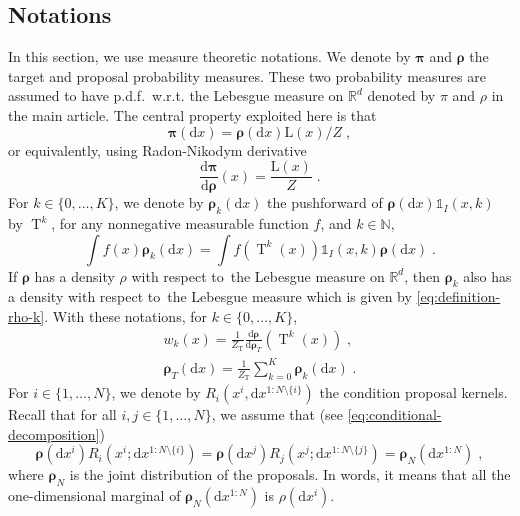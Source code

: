 \documentclass{article}
\def\transfo{\operatorname{T}}
\def\rmd{\operatorname{d}\hspace{-2pt}}
\def\rset{\mathbb{R}}
\def\nset{\mathbb{N}}
\def\dummy{f}
\def\rmd{\mathrm{d}}
\def\eqsp{\,}
\def\wrt{w.r.t.}
\def\eqsp{\;}
\newcommand{\1}{\mathds{1}}
\newcommand{\indi}[1]{\1_{#1}}
\def\w{w}
\def\target{\pi}
\def\proposal{\rho}
\newcommand{\chunku}[3]{#1^{#2:#3}}
\newcommand{\chunkum}[4]{#1^{#2:#3 \setminus \{#4\}}}
\def\rmi{\mathrm{I}}
\def\const{Z}
\def\measpi{\boldsymbol{\pi}}
\def\measprop{\boldsymbol{\rho}}
\def\rset{\mathbb{R}}
\def\nset{\mathbb{N}}
\def\rmd{\mathrm{d}}
\def\likelihood{\mathrm{L}}
\def\constT{\const_{\transfo}}
\def\pdf{p.d.f.}
\def\wrt{with respect to}
\begin{document}
 \subsection{Notations}
In this section, we use measure theoretic notations. We denote by $\measpi$ and $\measprop$ the target and proposal probability measures. These two probability measures are assumed to have \pdf\  w.r.t. the Lebesgue measure on $\rset^d$ denoted by $\target$ and $\proposal$ in the main article. %
The central property exploited here is that
\begin{equation}
\label{eq:key-relation}
\measpi(\rmd x)= \measprop(\rmd x) \likelihood(x) / \const \eqsp,
\end{equation}
or equivalently, using Radon-Nikodym derivative
\begin{equation}
\label{eq:with-derivative}
\frac{\rmd \measpi}{\rmd \measprop}(x)= \frac{\likelihood(x)}{\const}  \eqsp.
\end{equation}
For $k \in \{0,\dots,K\}$, we denote by $\measprop_k(\rmd x)$ the pushforward of $\measprop(\rmd x) \indi{I}(x,k)$ by $\transfo^k$, for any nonnegative measurable function $f$, and $k \in \nset$,
\begin{equation}
\int f(x) \measprop_k( \rmd x) = \int f(\transfo^k(x)) \indi{I}(x,k) \measprop(\rmd x)  \eqsp.
\end{equation}
If $\measprop$ has a density $\proposal$ \wrt\ the Lebesgue measure on $\rset^d$, then  $\measprop_k$ also has a density \wrt\ the Lebesgue measure which is given by \eqref{eq:definition-rho-k}.
With these notations, for $k \in \{0,\dots,K\}$,
\begin{align}
\label{eq:new-definition-weights}
\w_k(x)= \frac{1}{\constT} \frac{\rmd \measprop}{\rmd \measprop_T}(\transfo^k(x)) \eqsp,
\\
\label{eq:new-definition-rho_T}
\measprop_T(\rmd x)= \frac{1}{\constT} \sum_{k=0}^K \measprop_k(\rmd x) \eqsp.
\end{align}
For $i \in \{1,\dots,N\}$, we denote by $R_i(x^i,\rmd \chunkum{x}{1}{N}{i})$ the condition proposal kernels. Recall that for all $i,j \in \{1,\dots,N\}$, we assume that (see \eqref{eq:conditional-decomposition})
\begin{equation}
\label{eq:full-symmetry}
\measprop(\rmd x^i) R_i(x^i; \rmd \chunkum{x}{1}{N}{i})= \measprop(\rmd x^j) R_j(x^j; \rmd \chunkum{x}{1}{N}{j})= \measprop_N(\rmd \chunku{x}{1}{N}) \eqsp,
\end{equation}
where $\measprop_N$ is the joint distribution of the proposals. In words, it means that all the one-dimensional marginal of $\measprop_N(\rmd \chunku{x}{1}{N})$ is $\proposal(\rmd x^i)$.
\end{document}
